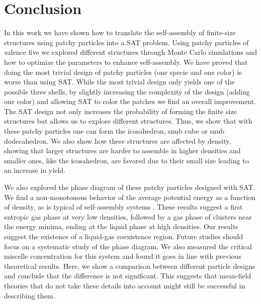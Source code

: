 \documentclass[a4paper, amsfonts, amssymb, amsmath, reprint, showkeys, nofootinbib, twoside]{revtex4-1}
\begin{document}
\section{Conclusion}

In this work we have shown how to translate the self-assembly of finite-size structures using patchy particles into a SAT problem. Using patchy particles of valence five we explored different structures through Monte Carlo simulations and how to optimize the parameters to enhance self-assembly. We have proved that doing the most trivial design of patchy particles (one specie and one color) is worse than using SAT. While the most trivial design only yields one of the possible three shells, by slightly increasing the complexity of the design (adding one color) and allowing SAT to color the patches we find an overall improvement. The SAT design not only increases the probability of forming the finite size structures but allows us to explore different structures. Thus, we show that with these patchy particles one can form the icosahedron, snub cube or snub dodecahedron. We also show how these structures are affected by density, showing that larger structures are harder to assemble in higher densities and smaller ones, like the icosahedron, are favored due to their small size leading to an increase in yield.

We also explored the phase diagram of these patchy particles designed with SAT. We find a non-monotonous behavior of the average potential energy as a function of density, as is typical of self-assembly systems \cite{Sciortino2009}. These results suggest a first entropic gas phase at very low densities, followed by a gas phase of clusters near the energy minima, ending at the liquid phase at high densities. Our results suggest the existence of a liquid-gas coexistence region. Future studies should focus on a systematic study of the phase diagram. We also measured the critical miscelle concentration for this system and found it goes in line with previous theoretical results. Here, we show a comparison between different particle designs and conclude that the difference is not significant. This suggests that mean-field theories that do not take these details into account might still be successful in describing them.
\end{document}
